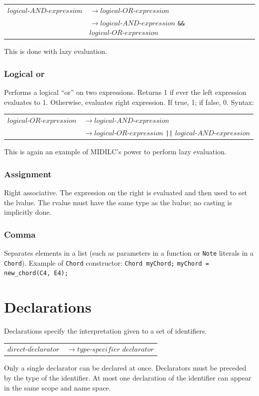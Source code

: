 \documentclass[12pt,A4]{book}
\begin{document}
\begin{tabular}{l l}
$logical\mbox{-}AND\mbox{-}expression$  & $\rightarrow logical\mbox{-}OR\mbox{-}expression$\\
& $\rightarrow logical\mbox{-}AND\mbox{-}expression$ \verb|&&| $logical\mbox{-}OR\mbox{-}expression$
\end{tabular}

This is done with lazy evaluation.
\subsubsection{Logical or}
Performs a logical ``or'' on two expressions. Returns 1 if ever the left expression evaluates to 1. Otherwise, evaluates right expression. If true, 1; if false, 0.
Syntax:

\begin{tabular}{l l}
$logical\mbox{-}OR\mbox{-}expression$  & $\rightarrow logical\mbox{-}AND\mbox{-}expression$\\
& $\rightarrow logical\mbox{-}OR\mbox{-}expression $ \verb.||. $ logical\mbox{-}AND\mbox{-}expression$
\end{tabular}

This is again an example of MIDILC’s power to perform lazy evaluation.
\subsubsection{Assignment}
Right associative. The expression on the right is evaluated and then used to set the lvalue. The rvalue must have the same type as the lvalue; no casting is implicitly done.
\subsubsection{Comma}
Separates elements in a list (such as parameters in a function or \verb|Note| literals in a \verb|Chord|). Example of \verb|Chord| constructor:
\verb|Chord myChord;| \verb|myChord = new_chord(C4, E4);|
\section{Declarations}
Declarations specify the interpretation given to a set of identifiers.

\begin{tabular}{l l}
$direct\mbox{-}declarator$ & $\rightarrow type\mbox{-}specifier$ $declarator$
\end{tabular}

Only a single declarator can be declared at once.  Declarators must be preceded by the type of the identifier.  At most one declaration of the identifier can appear in the same scope and name space.  
\end{document}
